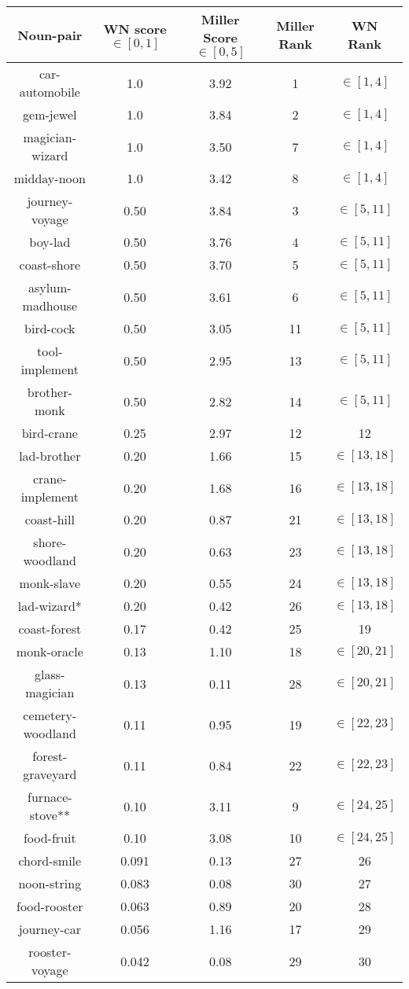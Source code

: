 \documentclass{article}
\begin{document}
\begin{enumerate}
\begin{tabular}{c  | c c c c }
Noun-pair & WN score $\in [0,1]$ & Miller Score $\in [0,5]$ & Miller Rank & WN Rank \\ \hline
car-automobile & 1.0 & 3.92 & 1 & $\in [1,4]$\\
gem-jewel & 1.0 &  3.84 & 2 & $\in [1,4]$ \\
magician-wizard & 1.0 & 3.50 & 7 &  $\in [1,4]$ \\
midday-noon & 1.0 & 3.42 & 8 &  $\in [1,4]$ \\
journey-voyage & 0.50 & 3.84 & 3 &  $\in [5,11]$\\
boy-lad & 0.50 & 3.76 & 4 & $\in [5,11]$ \\
coast-shore & 0.50 & 3.70 & 5 & $\in [5,11]$\\
asylum-madhouse & 0.50 & 3.61 & 6 & $\in [5,11]$ \\
bird-cock & 0.50 & 3.05 & 11 & $\in [5,11]$\\
tool-implement & 0.50 & 2.95 & 13 & $\in [5,11]$ \\
brother-monk & 0.50 & 2.82 & 14 & $\in [5,11]$\\
bird-crane & 0.25 & 2.97 & 12 & 12 \\
lad-brother & 0.20 & 1.66 & 15 & $\in [13,18]$ \\
crane-implement & 0.20 & 1.68 & 16  & $\in [13,18]$ \\
coast-hill & 0.20 & 0.87 & 21 & $\in [13,18]$\\
shore-woodland & 0.20 & 0.63 & 23 & $\in [13,18]$\\
monk-slave & 0.20 & 0.55 & 24 & $\in [13,18]$\\
lad-wizard* & 0.20 & 0.42 & 26 & $\in [13,18]$ \\
coast-forest & 0.17 & 0.42 & 25 & 19\\
monk-oracle & 0.13 & 1.10 & 18 & $\in [20,21]$ \\
glass-magician & 0.13 & 0.11 & 28 & $\in [20,21]$\\
cemetery-woodland & 0.11 & 0.95 & 19 & $\in [22,23]$\\
forest-graveyard & 0.11 & 0.84 & 22 & $\in [22,23]$\\
furnace-stove** & 0.10 & 3.11 & 9 & $\in [24,25]$\\
food-fruit & 0.10 & 3.08 & 10 & $\in [24,25]$\\
chord-smile & 0.091 & 0.13 & 27 & 26\\
noon-string & 0.083 & 0.08 & 30 & 27\\
food-rooster & 0.063 & 0.89 & 20 & 28\\
journey-car & 0.056 & 1.16 & 17 & 29 \\
rooster-voyage & 0.042 & 0.08 & 29 & 30
\end{tabular}

\end{enumerate}
\end{document}
